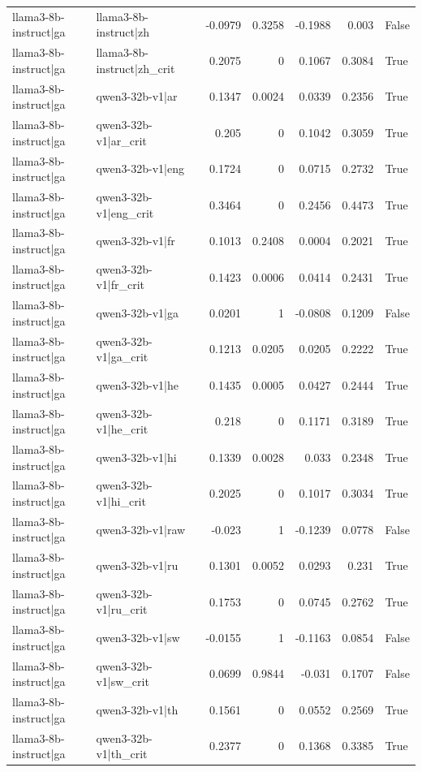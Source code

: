 \begin{table}
\begin{tabular}{l l r r r r l}
llama3-8b-instruct|ga & llama3-8b-instruct|zh & -0.0979 & 0.3258 & -0.1988 & 0.003 & False \\
llama3-8b-instruct|ga & llama3-8b-instruct|zh_crit & 0.2075 & 0 & 0.1067 & 0.3084 & True \\
llama3-8b-instruct|ga & qwen3-32b-v1|ar & 0.1347 & 0.0024 & 0.0339 & 0.2356 & True \\
llama3-8b-instruct|ga & qwen3-32b-v1|ar_crit & 0.205 & 0 & 0.1042 & 0.3059 & True \\
llama3-8b-instruct|ga & qwen3-32b-v1|eng & 0.1724 & 0 & 0.0715 & 0.2732 & True \\
llama3-8b-instruct|ga & qwen3-32b-v1|eng_crit & 0.3464 & 0 & 0.2456 & 0.4473 & True \\
llama3-8b-instruct|ga & qwen3-32b-v1|fr & 0.1013 & 0.2408 & 0.0004 & 0.2021 & True \\
llama3-8b-instruct|ga & qwen3-32b-v1|fr_crit & 0.1423 & 0.0006 & 0.0414 & 0.2431 & True \\
llama3-8b-instruct|ga & qwen3-32b-v1|ga & 0.0201 & 1 & -0.0808 & 0.1209 & False \\
llama3-8b-instruct|ga & qwen3-32b-v1|ga_crit & 0.1213 & 0.0205 & 0.0205 & 0.2222 & True \\
llama3-8b-instruct|ga & qwen3-32b-v1|he & 0.1435 & 0.0005 & 0.0427 & 0.2444 & True \\
llama3-8b-instruct|ga & qwen3-32b-v1|he_crit & 0.218 & 0 & 0.1171 & 0.3189 & True \\
llama3-8b-instruct|ga & qwen3-32b-v1|hi & 0.1339 & 0.0028 & 0.033 & 0.2348 & True \\
llama3-8b-instruct|ga & qwen3-32b-v1|hi_crit & 0.2025 & 0 & 0.1017 & 0.3034 & True \\
llama3-8b-instruct|ga & qwen3-32b-v1|raw & -0.023 & 1 & -0.1239 & 0.0778 & False \\
llama3-8b-instruct|ga & qwen3-32b-v1|ru & 0.1301 & 0.0052 & 0.0293 & 0.231 & True \\
llama3-8b-instruct|ga & qwen3-32b-v1|ru_crit & 0.1753 & 0 & 0.0745 & 0.2762 & True \\
llama3-8b-instruct|ga & qwen3-32b-v1|sw & -0.0155 & 1 & -0.1163 & 0.0854 & False \\
llama3-8b-instruct|ga & qwen3-32b-v1|sw_crit & 0.0699 & 0.9844 & -0.031 & 0.1707 & False \\
llama3-8b-instruct|ga & qwen3-32b-v1|th & 0.1561 & 0 & 0.0552 & 0.2569 & True \\
llama3-8b-instruct|ga & qwen3-32b-v1|th_crit & 0.2377 & 0 & 0.1368 & 0.3385 & True \\

\end{tabular}
\end{table}
